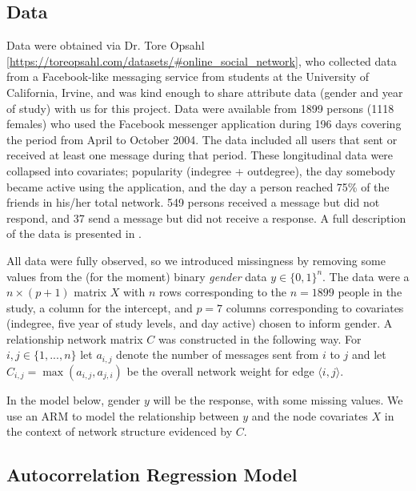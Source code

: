 \documentclass{article}
\def\bra{\langle}\def\ket{\rangle}
\begin{document}
\subsection{Data}
Data were obtained via Dr. Tore Opsahl [\url{https://toreopsahl.com/datasets/#online_social_network}], who collected data from a Facebook-like messaging service from students at the University of California, Irvine, and was kind enough to share attribute data (gender and year of study) with us for this project. Data were available from 1899 persons (1118 females) who used the Facebook messenger application during 196 days covering the period from April to October 2004. The data included all users that sent or received at least one message during that period. These longitudinal data were collapsed into covariates; popularity (indegree + outdegree), the day somebody became active using the application, and the day a person reached 75\% of the friends in his/her total network. 549 persons received a message but did not respond, and 37 send a message but did not receive a response. A full description of the data is presented in \cite{panzarasa2009patterns}.

All data were fully observed, so we introduced missingness by removing some values from the (for the moment) binary \textit{gender} data $y\in \{0,1\}^n$. The data were a $n \times (p+1)$ matrix $X$ with $n$ rows corresponding to the $n=1899$ people in the study, a column for the intercept, and $p=7$ columns corresponding to
covariates (indegree, five year of study levels, and day active) chosen to inform gender.
 A relationship network matrix $C$ was constructed in the following way. For $i,j\in\{1,...,n\}$ let $a_{i,j}$ denote the number of messages sent from $i$ to $j$ and let $C_{i,j}=\max(a_{i,j},a_{j,i})$ be the overall network weight for edge $\bra i,j\ket$.

 In the model below, gender $y$ will be the response, with some missing values. We use an ARM to model the relationship between $y$ and the node covariates $X$ in the context of network structure evidenced by $C$.

\subsection{Autocorrelation Regression Model}
\end{document}
